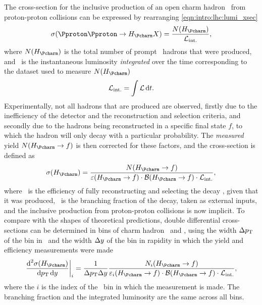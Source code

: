 The cross-section for the inclusive production of an open charm hadron \PHc\ 
from proton-proton collisions can be expressed by rearranging 
\cref{eqn:intro:lhc:lumi_xsec}
\begin{equation}
  \xsec(\ppToHc{}X) = \frac{N(\PHc)}{\intlumi},
  \label{eqn:prod:introduction:simple_cross_section}
\end{equation}
where $N(\PHc)$ is the total number of prompt \PHc\ hadrons that were produced, 
and \intlumi\ is the instantaneous luminosity \emph{integrated} over the time 
corresponding to the dataset used to measure $N(\PHc)$
\begin{equation}
  \mathcal{L}_{\textnormal{int.}} = \int \mathcal{L} \mathop{}\!\textnormal{d}{t}.
  \label{eqn:prod:introduction:integrated_lumi}
\end{equation}
Experimentally, not all hadrons that are produced are observed, firstly due to 
the inefficiency of the detector and the reconstruction and selection criteria, 
and secondly due to the hadrons being reconstructed in a specific final state 
$f$, to which the hadron will only decay with a particular probability.
The \emph{measured} yield $N(\HcTof)$ is then corrected for these factors, and the 
cross-section is defined as
\begin{equation}
  \xsec(\PHc) = \frac{%
    N(\HcTof)
  }{%
    \eff(\HcTof)\cdot\bfrac(\HcTof)\cdot\intlumi
  },
  \label{eqn:prod:introduction:cross_section}
\end{equation}
where \eff\ is the efficiency of fully reconstructing and selecting the decay 
\HcTof, given that it was produced, \bfrac\ is the branching fraction of the 
decay, taken as external inputs, and the inclusive production from 
proton-proton collisions is now implicit.
To compare with the shapes of theoretical predictions, double differential 
cross-sections can be determined in bins of charm hadron \pT\ and \rapidity, 
using the width $\Delta p_{\textnormal{T}}$ of the bin in \pT\ and the width $\Delta y$ 
of the bin in rapidity in which the yield and efficiency measurements were made
\begin{equation}
  \left.\frac{\dif^{2}{\xsec(\PHc)}}{\dif{\pT}\dif{\rapidity}}\right\rvert_{i}
    = \frac{1}{\Delta\pT\Delta\rapidity}
      \frac{%
        N_{i}(\HcTof)
      }{%
        \eff_{i}(\HcTof)\cdot\bfrac(\HcTof)\cdot\intlumi
      },
  \label{eqn:prod:introduction:differential_cross_section}
\end{equation}
where the $i$ is the index of the \pTy\ bin in which the measurement is made.
The branching fraction and the integrated luminosity are the same across all bins.

